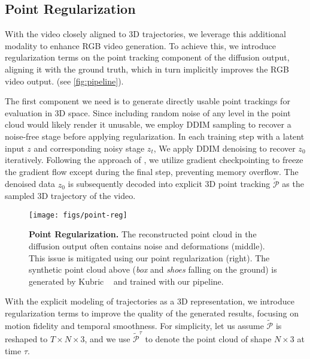 \subsection{Point Regularization}\label{sec:method:regularization}

With the video closely aligned to 3D trajectories, we leverage this additional modality to enhance RGB video generation. To achieve this, we introduce regularization terms on the point tracking component of the diffusion output, aligning it with the ground truth, which in turn implicitly improves the RGB video output. (see \autoref{fig:pipeline}).

The first component we need is to generate directly usable point trackings for evaluation in 3D space. Since including random noise of any level in the point cloud would likely render it unusable, we employ DDIM sampling to recover a noise-free stage before applying regularization. In each training step with a latent input $z$ and corresponding noisy stage $z_t$, We apply DDIM denoising to recover $z_0$ iteratively. Following the approach of \cite{yuan2024instructvideo}, we utilize gradient checkpointing to freeze the gradient flow except during the final step, preventing memory overflow. The denoised data $z_0$ is subsequently decoded into explicit 3D point tracking $\tilde{\mathcal P}$ as the sampled 3D trajectory of the video.

\begin{figure}
\texttt{[image: figs/point-reg]}
\caption{\textbf{Point Regularization.} The reconstructed point cloud in the diffusion output often contains noise and deformations (middle). This issue is mitigated using our point regularization (right). The synthetic point cloud above (\eg \emph{box} and \emph{shoes} falling on the ground) is generated by Kubric ~\cite{kubric} and trained with our pipeline.}\label{fig:point-reg}
\end{figure}


With the explicit modeling of trajectories as a 3D representation, we introduce regularization terms to improve the quality of the generated results, focusing on motion fidelity and temporal smoothness. For simplicity, let us assume $\tilde{\mathcal P}$ is reshaped to $T \times N \times 3$, and we use $\tilde{\mathcal P}^\tau$ to denote the point cloud of shape $N \times 3$ at time $\tau$.


